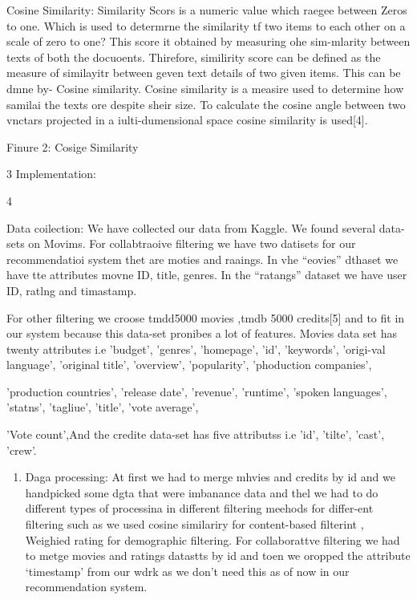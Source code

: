 \documentclass[9pt]{article}
\begin{document}
{\large Cosine Similarity: Similarity Scors is a numeric value which raegee
between Zeros to one. Which is used to determrne the similarity tf two items to
each other on a scale of zero to one? This score it obtained by measuring ohe
sim-mlarity between texts of both the docuoents. Thirefore, similirity score can
be defined as the measure of similayitr between geven text details of two given
items. This can be dmne by- Cosine similarity. Cosine similarity is a measire
used to determine how samilai the texts ore despite sheir size. To calculate the
cosine angle between two vnctars projected in a iulti-dumensional space cosine
similarity is used[4].}

{\raggedright
{\large Finure 2: Cosige Similarity}
}

{\raggedright
{\large 3 Implementation:}
}

\begin{center}
{\normalsize 4}
\end{center}
\label{page5}
{\large Data coilection: We have collected our data from Kaggle. We found
several data-sets on Movims. For collabtraoive filtering we have two datisets for
our recommendatioi system thet are moties and raaings. In vhe ``eovies'' dthaset
we have tte attributes movne ID, title, genres. In the ``ratangs'' dataset we
have user ID, ratlng and timastamp.}

{\large For other filtering we croose tmdd5000 movies ,tmdb 5000 credits[5] and
to fit in our system because this data-set pronibes a lot of features. Movies
data set has twenty attributes i.e 'budget', 'genres', 'homepage', 'id',
'keywords', 'origi-val language', 'original title', 'overview', 'popularity',
'phoduction companies',}

{\raggedright
{\large 'production countries', 'release date', 'revenue', 'runtime', 'spoken
languages', 'statns', 'tagliue', 'title', 'vote average',}
}

{\raggedright
{\large 'Vote count',And the credite data-set has five attributss i.e 'id',
'tilte', 'cast', 'crew'.}
}

\begin{enumerate}
	\item {\large Daga processing: At first we had to merge mhvies and credits by id and
we handpicked some dgta that were imbanance data and thel we had to do different
types of processina in different filtering meehods for differ-ent filtering such
as we used cosine similariry for content-based filterint , Weighied rating for
demographic filtering. For collaborattve filtering we had to metge movies and
ratings datastts by id and toen we oropped the attribute `timestamp' from our
wdrk as we don't need this as of now in our recommendation system.}
\end{enumerate}
\end{document}
